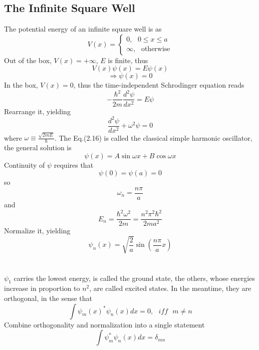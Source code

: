 \documentclass{article}
\numberwithin{equation}{section}
\begin{document}
\subsection{The Infinite Square Well}
The potential energy of an infinite square well is as
\begin{equation}
	V(x)=\left\{\begin{matrix}0,\text{       }0\leq x\leq a\\\infty,\text{       }\text{otherwise}\end{matrix}\right.
\end{equation}
Out of the box, $V(x)=+\infty$, $E$ is finite, thus
	$$V(x)\psi(x)=E\psi(x)$$
	$$\Rightarrow\psi(x)=0$$
In the box, $V(x)=0$, thus the time-independent Schrodinger equation reads
\begin{equation}
	-\frac{\hbar^2}{2m} \frac{d^2\psi}{dx^2}=E\psi
\end{equation}
Rearrange it, yielding
\begin{equation}
	\frac{d^2\psi}{dx^2}+\omega^2\psi=0
\end{equation}
where $\omega\equiv\frac{\sqrt{2mE}}{\hbar}$. The Eq.(2.16) is called the classical simple harmonic oscillator, the general solution is
\begin{equation}
	\psi(x)=A\sin \omega x+B\cos \omega x
\end{equation}
Continuity of $\psi$ requires that
\begin{equation}
	\psi(0)=\psi(a)=0
\end{equation}
so
\begin{equation}
	\omega_n=\frac{n\pi}{a}
\end{equation}
and
\begin{equation}
	E_n=\frac{\hbar^2\omega^2}{2m}=\frac{n^2\pi^2\hbar^2}{2ma^2}
\end{equation}
Normalize it, yielding
\begin{equation}
	\psi_n(x)=\sqrt{\frac{2}{a}}\sin(\frac{n\pi}{a}x)
\end{equation}
\\
\\
$\psi_1$ carries the lowest energy, is called the ground state, the others, whose energies increase in proportion to $n^2$, are called excited states. In the meantime, they are orthogonal, in the sense that
\begin{equation}
	\int\psi_m(x)^*\psi_n(x)dx=0,\text{  }iff\text{  }m\neq n
\end{equation}
Combine orthogonality and normalization into a single statement
\begin{equation}
	\int\psi_m^*\psi_n(x)dx=\delta_{mn}
\end{equation}
\end{document}
